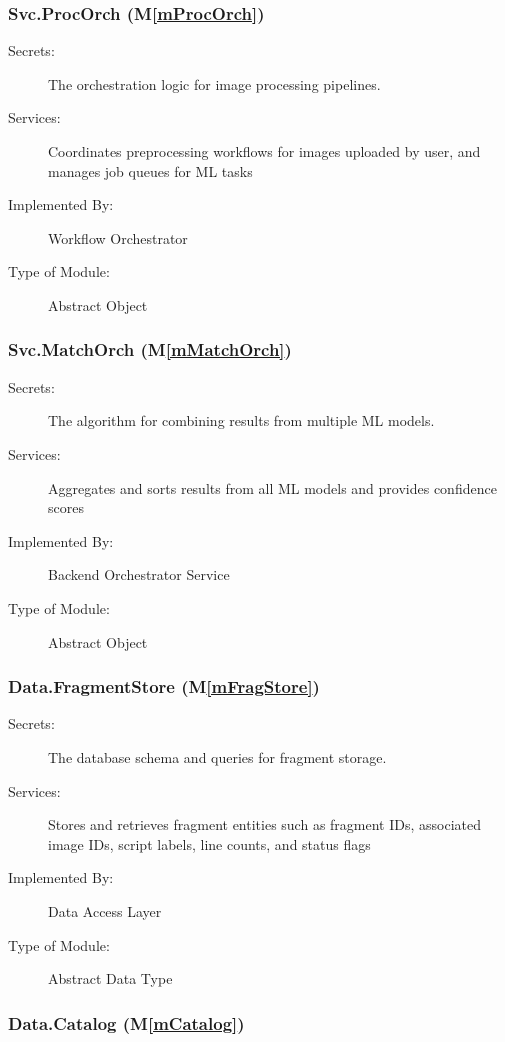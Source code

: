 \documentclass[12pt, titlepage]{article}
\newcommand{\mref}[1]{M\ref{#1}}
\begin{document}
\subsubsection{Svc.ProcOrch (\mref{mProcOrch})}

\begin{description}
\item[Secrets:] The orchestration logic for image processing pipelines.
\item[Services:] Coordinates preprocessing workflows for images uploaded by user, and manages job queues for ML tasks
\item[Implemented By:] Workflow Orchestrator
\item[Type of Module:] Abstract Object
\end{description}

\subsubsection{Svc.MatchOrch (\mref{mMatchOrch})}

\begin{description}
\item[Secrets:] The algorithm for combining results from multiple ML models.
\item[Services:] Aggregates and sorts results from all ML models and provides confidence scores
\item[Implemented By:] Backend Orchestrator Service
\item[Type of Module:] Abstract Object
\end{description}

\subsubsection{Data.FragmentStore (\mref{mFragStore})}

\begin{description}
\item[Secrets:] The database schema and queries for fragment storage.
\item[Services:] Stores and retrieves fragment entities such as fragment IDs, associated image IDs, script labels, line counts, and status flags  
\item[Implemented By:] Data Access Layer
\item[Type of Module:] Abstract Data Type
\end{description}

\subsubsection{Data.Catalog (\mref{mCatalog})}
\end{document}
